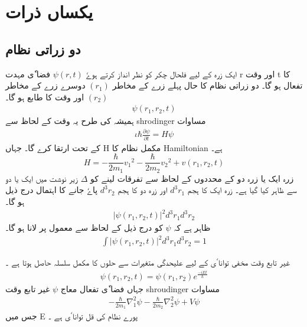 \documentclass{book}
\begin{document}
\setcounter{chapter}{4}
\chapter{ یکساں ذرات } 
 

\section{ دو زراتی نظام} 

ایک زرہ کے لیے فلحال چکر کو نظر انداز کرتے ہوےٗ  
$ \psi ( r , t ) $
فضا ٗی مہدت r اور وقت t کا تفعال ہو گا۔ دو زراتی نظام کا حال پہلے زرے کے مخاطر 
$ ( r_1 ) $
دوسرے زرے کے مخاطر 
$ ( r_2 ) $
اور وقت کا طابع ہو گا۔ 
\begin{align}   
\psi ( r_1 , r_2 , t ) 
\end{align}
 ہمیشہ کی طرح یہ وقت کے لحاظ سے shrodinger مساوات 
\begin{align}
\iota \hbar \frac{ \partial \psi }{ \partial t } = H \psi
\end{align}
کے تحت ارتقا کرے گا۔ جہاں H مکمل  نظام کا Hamiltonian  ہے۔
\begin{equation}
H = - \frac{ \hbar }{ 2 m_1 } {v_1}^2  -  \frac{ \hbar }{ 2 m_2 } { v_2 }^2 +  v( r_1 , r_2 , t )
\end{equation}
زرہ ایک یا زرہ دو کے محددوں کے لحاظ سے  تفرقات لینے کو 
$ \Delta $
زیر نوشت میں ایک یا دو سے ظاہر کیا گیا ہے۔ زرہ ایک کا ہجم 
$ d^3 r_1 $
اور زرہ دو کا ہجم
$ d^3 r_2 $
پاےٗ جانے کا اہتمال درج ذیل ہو گا۔ 
\begin{align}
| \psi ( r_1 , r_2 , t ) |^2 { d^3 } { r_1 }  { d^3 } { r_2 }
\end{align}
ظاہر ہے کہ 
$ \psi $
کو درج ذیل کے لحاظ سے معمول پر لانا ہو گا۔ 
\begin{align}
\int | \psi ( r_1 , r_2 , t ) |^2 { d^3 } { r_1 } { d^3 } { r_2 } = 1
\end{align}

\newpage

غیر تابع وقت مخفی توانا ٗی کے لیے علیحدگی  متغیرات  سے حلوں کا مکمل سلسلہ حاصل ہوتا ہے ۔ 
\begin{align}
\psi ( r_1 , r_2 , t ) =  \psi ( r_1 , r_2 ) {e}^\frac{ - i E t }{h}  
\end{align}
جہاں فضا ٗی تفعال معاج 
$ \psi $
غیر تابع وقت shroudinger مساوات 
\begin{align}
-\frac{ \hbar }{ 2 m_1 }  {\nabla_1^2} { \psi } - \frac{ \hbar }{ 2 m_2 } \nabla_2^2 { \psi } + V \psi 
\end{align}
جس میں E پورے نظام کی قل توانا ٗی ہے ۔ 
\end{document}
